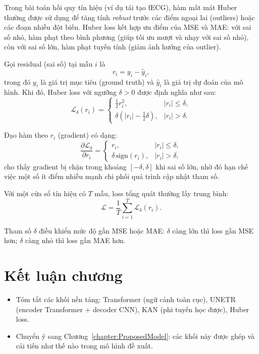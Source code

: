 \documentclass[../DoAn.tex]{subfiles}
\begin{document}
Trong bài toán hồi quy tín hiệu (ví dụ tái tạo fECG), hàm mất mát Huber thường được sử dụng để tăng tính \textit{robust} trước các điểm ngoại lai (outliers) hoặc các đoạn nhiễu đột biến. Huber loss kết hợp ưu điểm của MSE và MAE: với sai số nhỏ, hàm phạt theo bình phương (giúp tối ưu mượt và nhạy với sai số nhỏ), còn với sai số lớn, hàm phạt tuyến tính (giảm ảnh hưởng của outlier).

Gọi residual (sai số) tại mẫu $i$ là
\begin{equation}
  r_i = y_i - \hat{y}_i,
\end{equation}
trong đó $y_i$ là giá trị mục tiêu (ground truth) và $\hat{y}_i$ là giá trị dự đoán của mô hình. Khi đó, Huber loss với ngưỡng $\delta>0$ được định nghĩa như sau:
\begin{equation}
  \mathcal{L}_\delta(r_i)=
  \begin{cases}
    \frac{1}{2}r_i^2, & |r_i|\le \delta,\\[4pt]
    \delta\left(|r_i|-\frac{1}{2}\delta\right), & |r_i|>\delta.
  \end{cases}
\end{equation}

Đạo hàm theo $r_i$ (gradient) có dạng:
\begin{equation}
  \frac{\partial \mathcal{L}_\delta}{\partial r_i}=
  \begin{cases}
    r_i, & |r_i|\le \delta,\\[4pt]
    \delta\,\mathrm{sign}(r_i), & |r_i|>\delta,
  \end{cases}
\end{equation}
cho thấy gradient bị chặn trong khoảng $\left[-\delta,\delta\right]$ khi sai số lớn, nhờ đó hạn chế việc một số ít điểm nhiễu mạnh chi phối quá trình cập nhật tham số.

Với một cửa sổ tín hiệu có $T$ mẫu, loss tổng quát thường lấy trung bình:
\begin{equation}
  \mathcal{L}=\frac{1}{T}\sum_{i=1}^{T}\mathcal{L}_\delta(r_i).
\end{equation}

Tham số $\delta$ điều khiển mức độ gần MSE hoặc MAE: $\delta$ càng lớn thì loss gần MSE hơn; $\delta$ càng nhỏ thì loss gần MAE hơn.

\section{Kết luận chương}
\begin{itemize}
  \item Tóm tắt các khối nền tảng: Transformer (ngữ cảnh toàn cục), UNETR (encoder Transformer + decoder CNN), KAN (phi tuyến học được), Huber loss.
  \item Chuyển ý sang Chương~\ref{chapter:ProposedModel}: các khối này được ghép và cải tiến như thế nào trong mô hình đề xuất.
\end{itemize}
\end{document}
